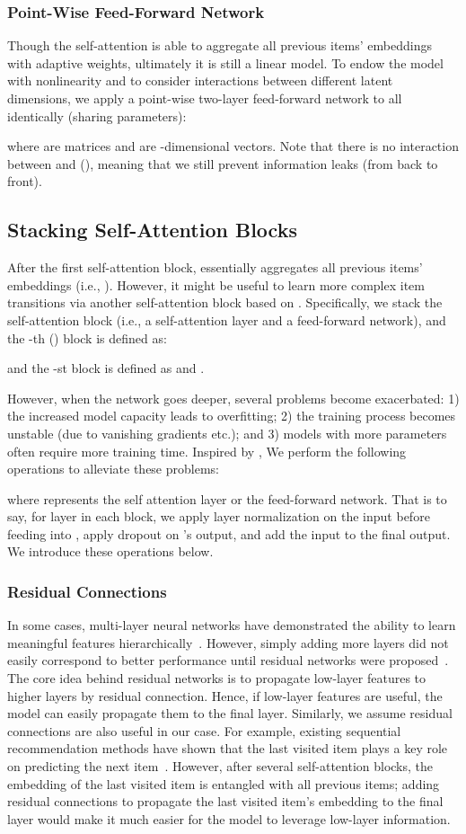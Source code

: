\documentclass[conference]{IEEEtran}
\newcommand{\xhdr}[1]{\subsubsection*{\bf #1}}
\begin{document}
\xhdr{Point-Wise Feed-Forward Network} Though the self-attention is able to aggregate all previous items' embeddings with adaptive weights, ultimately 
it is
still a linear model. To endow the model with 
nonlinearity and 
to
consider interactions between different latent dimensions, 
we apply
a point-wise two-layer feed-forward network 
to all 
identically (sharing parameters):

where  are  matrices and  are -dimensional vectors. Note that 
there is no interaction between  and  (), meaning that we still prevent 
information leaks (from back to front).


\subsection{Stacking Self-Attention Blocks}

After the first self-attention block,  essentially aggregates all previous items' embeddings (i.e., ). However, it might be useful to learn more complex item transitions via 
another self-attention block based on . Specifically, we stack the self-attention block (i.e., a self-attention layer and a feed-forward network), and the -th () block is defined as:

and the -st block is defined as  and .

However, when the network goes deeper, several problems become 
exacerbated:
1) the 
increased
model capacity leads to 
overfitting; 2) the training process 
becomes
unstable (due to vanishing gradients etc.); and
3) models with more parameters often require more training time. Inspired by \cite{transform}, We perform the following operations to alleviate these problems:

where  represents the self attention layer or the feed-forward network. That is to say, for layer  in each block, we apply 
layer normalization on the input  before feeding into , apply dropout on 's output, and add the input  to the final output. We introduce these operations
below.

\xhdr{Residual Connections} In some cases, multi-layer neural networks have 
demonstrated
the ability to learn meaningful features hierarchically~\cite{zeiler2014visualizing}. However, 
simply
adding more layers 
did not easily correspond to
better performance until residual networks
were
proposed~\cite{he2016deep}. 
The core idea behind residual networks is to
propagate
low-layer features to 
higher layers by 
residual 
connection. Hence, if low-layer features are useful, the model can easily propagate 
them
to the final layer. Similarly, we assume 
residual connections are also useful in our case. For example, existing sequential recommendation methods have shown that the last visited item plays a key role on predicting the next item~\cite{rendle2010fpmc,DBLP:conf/icdm/HeM16,DBLP:conf/recsys/HeKM17}. However, after several self-attention blocks, the embedding of the last visited item is entangled with all previous items;
adding residual connections to propagate the last visited item's embedding to the final layer would make it much easier for the model to leverage low-layer information.
\end{document}
